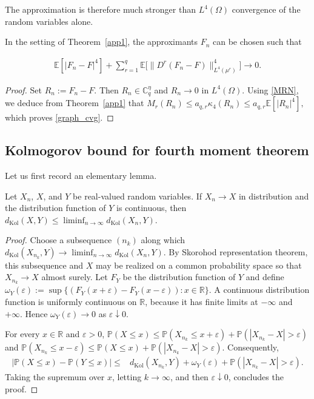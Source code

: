 \documentclass[ECP,preprint]{ejpecp}
\newcommand{\E}{\mathbb{E}}
\newcommand{\PP}{\mathbb{P}}
\newcommand{\R}{\mathbb{R}}
\newcommand{\bC}{\mathbb{C}^\eta}
\newcommand{\dK}{d_{\mathrm{Kol}}}
\newcommand{\eps}{\varepsilon}
\newcommand{\noi}{\noindent}
\begin{document}
The approximation is therefore much stronger than $L^4(\Omega)$ convergence
of the random variables alone.

\begin{corollary}
\label{cor_graph}
In the setting of Theorem~\ref{app1}, the approximants
$F_n$ can be chosen such that 

\noi
\begin{align}
  \E[|F_n-F|^4]
  +\sum_{r=1}^q
 \E\bigl[   \| D^r(F_n-F)\|^4_{L^4(\mu^r)}\bigr]
  \longrightarrow0.
  \label{graph_cvg}
\end{align}
\end{corollary}

\begin{proof}
Set $R_n:=F_n-F$.  Then $R_n\in\bC_q$ and
$R_n\to0$ in $L^4(\Omega)$. Using  \eqref{MRN},
we deduce from 
  Theorem~\ref{app1} that 
$
  M_r(R_n)
  \leq a_{q,r}\kappa_4(R_n)
  \leq a_{q,r}\E[|R_n|^4],
$
which proves \eqref{graph_cvg}.
\end{proof}

 
 
 
 \subsection{Kolmogorov bound for fourth moment theorem} \label{SEC_24}

 
 Let us first record an elementary lemma. 
 
 
 

\begin{lemma}
\label{lem_lsc}
Let $X_n$, $X$, and $Y$ be real-valued random variables.  If
$X_n\to X$ in distribution and the distribution function of $Y$ is
continuous, then
$\dK(X,Y)
  \leq\liminf_{n\to\infty}\dK(X_n,Y).
$
\end{lemma}

\begin{proof}
Choose a subsequence $(n_k)$ along which
$
\dK(X_{n_k},Y)
\to 
\liminf_{n\to\infty} \dK(X_n,Y).
$
By   Skorohod representation theorem, this subsequence and $X$ may
be realized on a common probability space so that
$X_{n_k}\to X$ almost surely.  Let $F_Y$ be the distribution function
of $Y$ and define
$\omega_Y(\eps)
  :=\sup\{   (F_Y(x+\eps)-F_Y(x-\eps)) :x\in\R \}.
  $
A continuous distribution function is uniformly continuous on $\R$,
because it has finite limits at $-\infty$ and $+\infty$.  Hence
$\omega_Y(\eps)\to0$ as $\eps\downarrow0$.

For every $x\in\R$ and $\eps>0$,
$
  \PP(X\leq x)
  \leq\PP(X_{n_k}\leq x+\eps)
  +\PP(|X_{n_k}-X|>\eps)
$
and
$
  \PP(X_{n_k}\leq x-\eps)
  \leq\PP(X\leq x)
  +\PP(|X_{n_k}-X|>\eps).
$
Consequently,
\[
\begin{aligned}
  \bigl|\PP(X\leq x)-\PP(Y\leq x)\bigr|
  \leq{}&\dK(X_{n_k},Y)+\omega_Y(\eps)
  +\PP(|X_{n_k}-X|>\eps).
\end{aligned}
\]
Taking the supremum over $x$, letting $k\to\infty$, and then 
$\eps\downarrow0$, concludes the proof. 
\end{proof}
\end{document}
